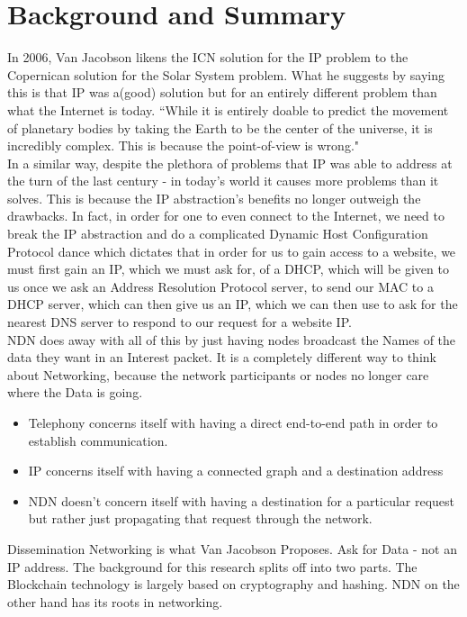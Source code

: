 \section{Background and Summary}
In 2006, Van Jacobson likens the ICN solution for the IP problem to the Copernican solution for the Solar System problem.\cite{010} What he suggests by saying this is that IP was a(good) solution but for an entirely different problem than what the Internet is today. ``While it is entirely doable to predict the movement of planetary bodies by taking the Earth to be the center of the universe, it is incredibly complex. This is because the point-of-view is wrong." \cite{011} 
\\
In a similar way, despite the plethora of problems that IP was able to address at the turn of the last century - in today's world it causes more problems than it solves. This is because the IP abstraction's benefits no longer outweigh the drawbacks. In fact, in order for one to even connect to the Internet, we need to break the IP abstraction and do a complicated Dynamic Host Configuration Protocol dance which dictates that in order for us to gain access to a website, we must first gain an IP, which we must ask for, of a DHCP, which will be given to us once we ask an Address Resolution Protocol server, to send our MAC to a DHCP server, which can then give us an IP, which we can then use to ask for the nearest DNS server to respond to our request for a website IP. 
\\
NDN does away with all of this by just having nodes broadcast the Names of the data they want in an Interest packet. It is a completely different way to think about Networking, because the network participants or nodes no longer care where the Data is going. \par 
\begin{itemize}

\item Telephony concerns itself with having a direct end-to-end path in order to establish communication.
\item IP concerns itself with having a connected graph and a destination address
\item NDN doesn't concern itself with having a destination for a particular request but rather just propagating that request through the network.
\end{itemize}
Dissemination Networking is what Van Jacobson Proposes. Ask for Data - not an IP address. The background for this research splits off into two parts. The Blockchain technology is largely based on cryptography and hashing. NDN on the other hand has its roots in networking. 

